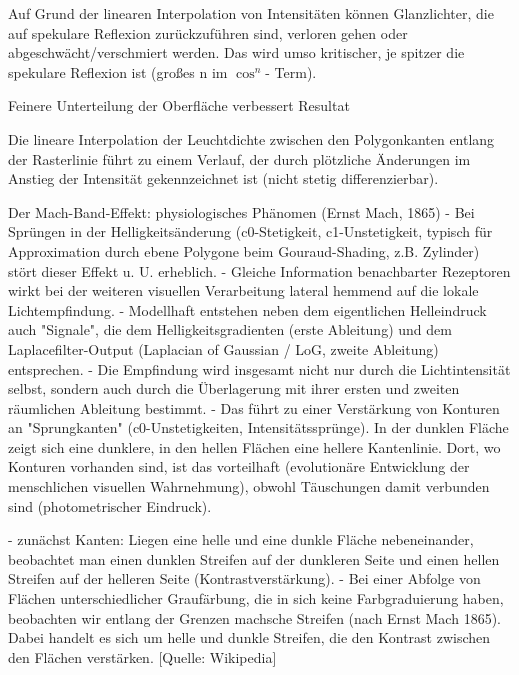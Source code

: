 \documentclass[10pt,landscape]{article}
\begin{document}
\begin{multicols}{3}
Auf Grund der linearen Interpolation von Intensitäten können Glanzlichter, die auf spekulare Reflexion zurückzuführen sind, verloren gehen oder abgeschwächt/verschmiert werden. Das wird umso kritischer, je spitzer die spekulare Reflexion ist (großes n im $\cos^n$- Term).

Feinere Unterteilung der Oberfläche verbessert Resultat


Die lineare Interpolation der Leuchtdichte zwischen den Polygonkanten entlang der Rasterlinie führt zu einem Verlauf, der durch plötzliche Änderungen im Anstieg der Intensität gekennzeichnet ist (nicht stetig differenzierbar).

Der Mach-Band-Effekt: physiologisches Phänomen (Ernst Mach, 1865)
- Bei Sprüngen in der Helligkeitsänderung (c0-Stetigkeit, c1-Unstetigkeit, typisch für Approximation durch ebene Polygone beim Gouraud-Shading, z.B. Zylinder) stört dieser Effekt u. U. erheblich.
- Gleiche Information benachbarter Rezeptoren wirkt bei der weiteren visuellen Verarbeitung lateral hemmend auf die lokale Lichtempfindung.
- Modellhaft entstehen neben dem eigentlichen Helleindruck auch "Signale", die dem Helligkeitsgradienten (erste Ableitung) und dem Laplacefilter-Output (Laplacian of Gaussian / LoG, zweite Ableitung) entsprechen.
- Die Empfindung wird insgesamt nicht nur durch die Lichtintensität selbst, sondern auch durch die Überlagerung mit ihrer ersten und zweiten räumlichen Ableitung bestimmt.
- Das führt zu einer Verstärkung von Konturen an "Sprungkanten" (c0-Unstetigkeiten, Intensitätssprünge). In der dunklen Fläche zeigt sich eine dunklere, in den hellen Flächen eine hellere Kantenlinie. Dort, wo Konturen vorhanden sind, ist das vorteilhaft (evolutionäre Entwicklung der menschlichen visuellen Wahrnehmung), obwohl Täuschungen damit verbunden sind (photometrischer Eindruck).

- zunächst Kanten: Liegen eine helle und eine dunkle Fläche nebeneinander, beobachtet man einen dunklen Streifen auf der dunkleren Seite und einen hellen Streifen auf der helleren Seite (Kontrastverstärkung).
- Bei einer Abfolge von Flächen unterschiedlicher Graufärbung, die in sich keine Farbgraduierung haben, beobachten wir entlang der Grenzen machsche Streifen (nach Ernst Mach 1865). Dabei handelt es sich um helle und dunkle Streifen, die den Kontrast zwischen den Flächen verstärken. [Quelle: Wikipedia]


\end{multicols}
\end{document}
